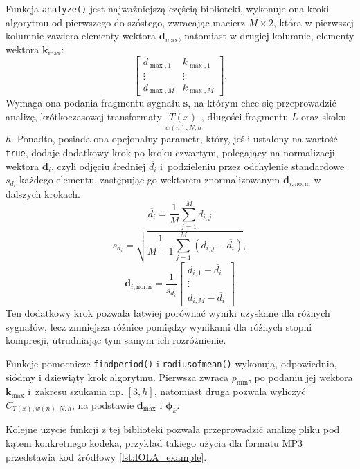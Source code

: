 \documentclass[pl,12pt]{aghdpl}
\begin{document}
Funkcja \lstinline|analyze()| jest najważniejszą częścią biblioteki, wykonuje
ona kroki algorytmu od pierwszego do szóstego, zwracając macierz $M \times 2$,
która w pierwszej kolumnie zawiera elementy wektora $\bm d_{\max}$, natomiast w
drugiej kolumnie, elementy wektora $\bm k_{\max}$:
\[\begin{bmatrix}
    d_{\max,1} & k_{\max,1}\\
    \vdots & \vdots\\
    d_{\max,M} & k_{\max,M}
\end{bmatrix}.\]
Wymaga ona podania fragmentu sygnału $\bm s$, na którym chce się przeprowadzić
analizę, krótkoczasowej transformaty $\underset{w(n),N,h}{T(x)}$, długości
fragmentu $L$ oraz skoku $h$. Ponadto, posiada ona opcjonalny parametr, który,
jeśli ustalony na wartość \lstinline|true|, dodaje dodatkowy krok po kroku
czwartym, polegający na normalizacji wektora $\bm d_i$, czyli odjęciu średniej
$\overline{d_i}$ i~podzieleniu przez odchylenie standardowe $s_{d_i}$ każdego
elementu, zastępując go wektorem znormalizowanym $\bm d_{i, \text{norm}}$ w
dalszych krokach.
\begin{equation}
  \overline{d_i} = \frac{1}{M}\sum_{j=1}^{M}d_{i,j}
\end{equation}
\begin{equation}
  s_{d_i} = \sqrt{\frac{1}{M-1}\sum_{j=1}^{M}\left(d_{i, j} -
  \overline{d_{i}}\right)},
\end{equation}
\begin{equation}
  \bm d_{i, \text{norm}} = \frac{1}{s_{d_i}}\begin{bmatrix}
    d_{i,1} - \overline{d_i}\\
    \vdots\\
    d_{i,M} - \overline{d_i}
  \end{bmatrix}
\end{equation}
Ten dodatkowy krok pozwala łatwiej porównać wyniki uzyskane dla różnych
sygnałów, lecz zmniejsza różnice pomiędzy wynikami dla różnych stopni
kompresji, utrudniając tym samym ich rozróżnienie.

Funkcje pomocnicze \lstinline|findperiod()| i \lstinline|radiusofmean()|
wykonują, odpowiednio, siódmy i dziewiąty krok algorytmu. Pierwsza zwraca
$p_{\min}$, po podaniu jej wektora $\bm k_{\max}$ i~zakresu szukania np.
$[3,h]$, natomiast druga pozwala wyliczyć $C_{T(x),w(n),N,h}$, na podstawie $\bm
d_{\max}$ i $\bm\phi_k$.

Kolejne użycie funkcji z tej biblioteki pozwala przeprowadzić analizę pliku pod
kątem konkretnego kodeka, przykład takiego użycia dla formatu MP3 przedstawia
kod źródłowy \ref{lst:IOLA_example}.
\end{document}
